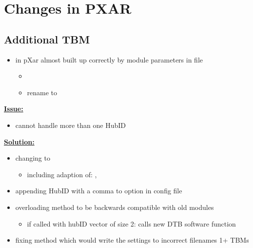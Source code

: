 \documentclass[9pt]{beamer}
\begin{document}
\section{Changes in PXAR}
\subsection{Additional TBM}
\begin{frame}
	\begin{itemize}
		\item {} in pXar almost built up correctly by module parameters in  file
		\begin{itemize}
			\item {}
			\item rename  to 
		\end{itemize}
	\end{itemize}
	\vspace*{10pt}
	\underline{\textbf{Issue:}}
	\begin{itemize}
		\item cannot handle more than one HubID 
	\end{itemize}
	\vspace*{10pt}
	\underline{\textbf{Solution:}}
	\begin{itemize}
		\setlength{\itemsep}{\fill}
		\item changing  to 
		\begin{itemize}
			\item including adaption of: , 
		\end{itemize}
		\item appending HubID with a comma to  option in config file
		\item overloading  method to be backwards compatible with old modules
		\begin{itemize}
			\item if called with hubID vector of size 2: calls new DTB software function 
		\end{itemize}
		\item fixing method  which would write the settings to incorrect filenames 1+ TBMs
	\end{itemize}

\end{frame}
\end{document}
